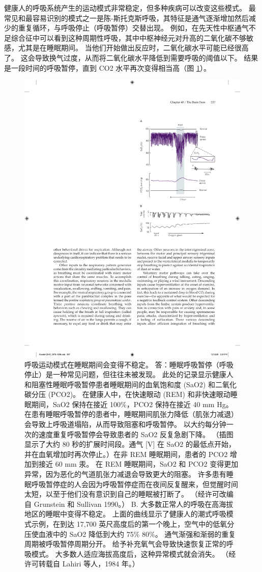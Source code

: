 健康人的呼吸系统产生的运动模式非常稳定，但多种疾病可以改变这些模式。 最常见和最容易识别的模式之一是陈-斯托克斯呼吸，其特征是通气逐渐增加然后减少的重复循环，与呼吸停止（呼吸暂停）交替出现。 例如，在先天性中枢通气不足综合征中可以看到这种周期性呼吸，其中中枢神经元对升高的二氧化碳不够敏感，尤其是在睡眠期间。 当他们开始做出反应时，二氧化碳水平可能已经很高了。 
这会导致换气过度，从而将二氧化碳水平降低到需要呼吸的阈值以下。 
结果是一段时间的呼吸暂停，直到 CO2 水平再次变得相当高（图 \ref{fig:40_10}）。

\begin{figure}[htbp]
	\centering
	\includegraphics[width=0.5\linewidth]{chap40/fig_40_10}
	\caption{呼吸运动模式在睡眠期间会变得不稳定。 答：睡眠呼吸暂停（呼吸停止）是一种常见问题，但往往未被发现。 此处的记录显示健康人和阻塞性睡眠呼吸暂停患者睡眠期间的血氧饱和度 (SaO2) 和二氧化碳分压 (PCO2)。 在健康人中，在快速眼动 (REM) 和非快速眼动睡眠期间，SaO2 保持在接近 100\%，PCO2 保持在接近 40 mm Hg。 在患有睡眠呼吸暂停的患者中，睡眠期间肌张力降低（肌张力减退）会导致上呼吸道塌陷，从而导致阻塞和呼吸暂停。 以大约每分钟一次的速度重复呼吸暂停会导致患者的 SaO2 反复急剧下降。 （插图显示了大约 80 秒的扩展时间段。通气 [V] 在 SaO2 的最低点开始，并在血氧增加时再次停止。）在非 REM 睡眠期间，患者的 PCO2 增加到接近 60 mm 汞。 在 REM 睡眠期间，SaO2 和 PCO2 变得更加异常，因为恶化的气道肌张力减退会导致更大的阻塞。 许多患有睡眠呼吸暂停症的人会因为呼吸暂停症而在夜间反复醒来，但觉醒时间太短，以至于他们没有意识到自己的睡眠被打断了。 （经许可改编自 Grunstein 和 Sullivan 1990。） B. 大多数正常人的呼吸在高海拔地区的睡眠中变得不稳定。 上面的曲线显示了健康人的潮式呼吸模式示例，在到达 17,700 英尺高度后的第一个晚上，空气中的低氧分压使血液中的 SaO2 降低到大约 75\% 80\%。 通气渐强和渐弱的重复周期被呼吸暂停周期分开。 给予补充氧气会导致快速恢复正常的呼吸模式。 大多数人适应海拔高度后，这种异常模式就会消失。 （经许可转载自 Lahiri 等人，1984 年。）}
	\label{fig:40_10}
\end{figure}

